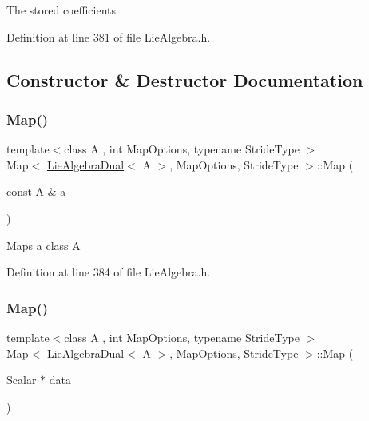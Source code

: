 The stored coefficients 

Definition at line 381 of file Lie\+Algebra.\+h.



\subsection{Constructor \& Destructor Documentation}
\hypertarget{class_map_3_01_lie_algebra_dual_3_01_a_01_4_00_01_map_options_00_01_stride_type_01_4_a343da7ed6d4069324cd174c8fa51a43f}{}\label{class_map_3_01_lie_algebra_dual_3_01_a_01_4_00_01_map_options_00_01_stride_type_01_4_a343da7ed6d4069324cd174c8fa51a43f} 
\subsubsection{\texorpdfstring{Map()}{Map()}\hspace{0.1cm}{\footnotesize\ttfamily [1/3]}}
{\footnotesize\ttfamily template$<$class A , int Map\+Options, typename Stride\+Type $>$ \\
Map$<$ \hyperlink{class_lie_algebra_dual}{Lie\+Algebra\+Dual}$<$ A $>$, Map\+Options, Stride\+Type $>$\+::Map (\begin{DoxyParamCaption}\item[{const A \&}]{a }\end{DoxyParamCaption})\hspace{0.3cm}{\ttfamily [inline]}}

Maps a class A 

Definition at line 384 of file Lie\+Algebra.\+h.

\hypertarget{class_map_3_01_lie_algebra_dual_3_01_a_01_4_00_01_map_options_00_01_stride_type_01_4_abb5e0ae70ea55163f6890a8ccf4be175}{}\label{class_map_3_01_lie_algebra_dual_3_01_a_01_4_00_01_map_options_00_01_stride_type_01_4_abb5e0ae70ea55163f6890a8ccf4be175} 
\subsubsection{\texorpdfstring{Map()}{Map()}\hspace{0.1cm}{\footnotesize\ttfamily [2/3]}}
{\footnotesize\ttfamily template$<$class A , int Map\+Options, typename Stride\+Type $>$ \\
Map$<$ \hyperlink{class_lie_algebra_dual}{Lie\+Algebra\+Dual}$<$ A $>$, Map\+Options, Stride\+Type $>$\+::Map (\begin{DoxyParamCaption}\item[{Scalar $\ast$}]{data }\end{DoxyParamCaption})\hspace{0.3cm}{\ttfamily [inline]}}

